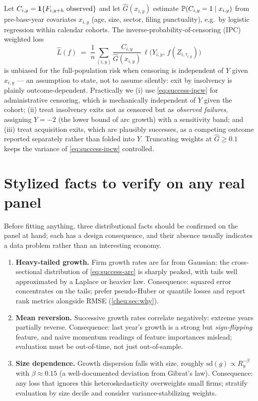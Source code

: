 Let $C_{i,y} = \mathbf{1}\{F_{i,y+h}~\text{observed}\}$ and let $\hat G(x_{i,y})$ estimate
$\mathbb{P}(C_{i,y}=1 \mid x_{i,y})$ from pre-base-year covariates $x_{i,y}$ (age, size, sector,
filing punctuality), e.g.\ by logistic regression within calendar cohorts. The
inverse-probability-of-censoring (IPC) weighted loss
\begin{equation}\label{eq:success-ipcw}
\hat{L}(f) \;=\; \frac{1}{n}\sum_{(i,y)} \frac{C_{i,y}}{\hat
G(x_{i,y})}\, \ell\big(Y_{i,y},\, f(Z_{i,\tau_{i,y}})\big)
\end{equation}
is unbiased for the full-population risk when censoring is independent of $Y$ given $x_{i,y}$
--- an assumption to state, not to assume silently: exit by insolvency is plainly
outcome-dependent. Practically we (i) use \cref{eq:success-ipcw} for administrative censoring,
which is mechanically independent of $Y$ given the cohort; (ii) treat insolvency exits not as
censored but as \emph{observed failures}, assigning $Y = -2$ (the lower bound of arc growth)
with a sensitivity band; and (iii) treat acquisition exits, which are plausibly successes, as a
competing outcome reported separately rather than folded into $Y$. Truncating weights at $\hat G
\ge 0.1$ keeps the variance of \cref{eq:success-ipcw} controlled.

\section{Stylized facts to verify on any real panel}\label{cheu:sec:stylized}

Before fitting anything, three distributional facts should be confirmed on the panel at hand;
each has a design consequence, and their absence usually indicates a data problem rather than an
interesting economy.

\begin{enumerate}
\item \textbf{Heavy-tailed growth.} Firm growth rates are far from Gaussian: the cross-sectional
distribution of \cref{eq:success-arc} is sharply peaked, with tails well approximated by a
Laplace or heavier law. Consequence: squared error concentrates on the tails; prefer
pseudo-Huber or quantile losses and report rank metrics alongside RMSE (\cref{cheu:sec:why}).
\item \textbf{Mean reversion.} Successive growth rates correlate negatively: extreme years
partially reverse. Consequence: last year's growth is a strong but \emph{sign-flipping}
feature, and naive momentum readings of feature importances mislead; evaluation must be
out-of-time, not just out-of-sample.
\item \textbf{Size dependence.} Growth dispersion falls with size, roughly $\mathrm{sd}(g)
\propto R_y^{-\beta}$ with $\beta \approx 0.15$ (a well-documented deviation from Gibrat's
law). Consequence: any loss that ignores this heteroskedasticity overweights small firms;
stratify evaluation by size decile and consider variance-stabilizing weights.
\end{enumerate}


